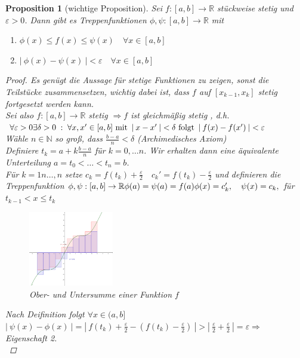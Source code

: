 \documentclass[a4paper,titlepage,oneside]{article}
\def\N{\ensuremath{\mathbb{N}} }
\def\R{\ensuremath{\mathbb{R}} }
\renewcommand{\epsilon}{\ensuremath{\varepsilon} }
\def\sp{\hspace{0,1cm}}
\newcommand{\abs}[1]{\ensuremath{\left|\:#1\:\right|}}
\theoremstyle{thmstyle}
\newtheorem{prop}[satz]{Proposition}
\theoremstyle{subthmstyle}
\begin{document}
\begin{prop}[wichtige Proposition]
Sei $f : [a,b] \to \R$ stückweise stetig und $\epsilon > 0$. Dann gibt es Treppenfunktionen $\phi, \psi : [a,b] \to \R$ mit
\begin{enumerate}
\item $\phi(x) \le f(x) \le \psi(x) \quad \forall x \in [a,b]$
\item $\abs{\phi(x) - \psi(x)} < \epsilon \quad \forall x \in [a,b]$
\end{enumerate}
\begin{proof}
Es genügt die Aussage für stetige Funktionen zu zeigen, sonst die Teilstücke zusammensetzen, wichtig dabei ist, dass $f$ auf $[x_{k-1},x_k]$ stetig fortgesetzt werden kann.\\
Sei also $f: [a,b] \to \R$ stetig $\Rightarrow f$ ist gleichmäßig stetig , d.h. $\forall \epsilon > 0 \exists \delta > 0 \sp: \sp \forall x, x' \in [a,b] \text{ mit } \abs{x- x'} < \delta \text{ folgt } \abs{f(x) - f(x')} < \epsilon$\\
Wähle $n\in \N$ so groß, dass $\displaystyle \frac{b-a}{n} < \delta$ (Archimedisches Axiom)\\
Definiere $\displaystyle t_k = a+ k\frac{b-a}{n}$ für $ k = 0,\dots n$. Wir erhalten dann eine äquivalente Unterteilung $a = t_0 < \dots < t_n = b$.\\
Für $k=1n\dots,n$ setze $\displaystyle c_k = f(t_k) + \frac{\epsilon}{2} \quad c_k' = f(t_k) - \frac{\epsilon}{2}$ und definieren die Treppenfunktion $\phi, \psi : [a,b] \to \R \\
 \phi(a)= \psi(a) = f(a) \\
  \phi(x) = c_k', \quad \psi(x) = c_k, $ für $t_{k-1} < x \le t_k$ \\ 
\begin{figure}[ht]\centering
 \includegraphics[width=0.33\textwidth]{images/ober_untersumme.png}
\caption{Ober- und Untersumme einer Funktion $f$}
\end{figure}
Nach Deifinition folgt $\forall x \in (a,b]$\\
$\displaystyle \abs{\psi(x) - \phi(x)} = \abs{f(t_k) + \frac{\epsilon}{2} - (f(t_k) -\frac{\epsilon}{2})} > \abs{\frac{\epsilon}{2} + \frac{\epsilon}{2}} = \epsilon \Rightarrow $ Eigenschaft 2.\\

\end{proof}
\end{prop}
\end{document}
